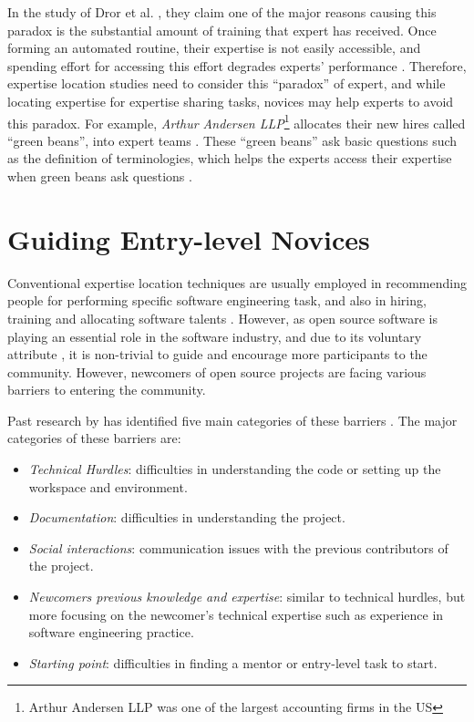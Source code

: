 In the study of Dror et al. \cite{dror2011paradox}, they claim one of the major reasons causing this paradox is the substantial amount of training that expert has received. Once forming an automated routine, their expertise is not easily accessible, and spending effort for accessing this effort degrades experts' performance \cite{flegal2008overthinking}. Therefore, expertise location studies need to consider this ``paradox'' of expert, and while locating expertise for expertise sharing tasks, novices may help experts to avoid this paradox. For example, \textit{Arthur Andersen LLP}\footnote{Arthur Andersen LLP was one of the largest accounting firms in the US} allocates their new hires called ``green beans'', into expert teams \cite{greenbeans}. These ``green beans'' ask basic questions such as the definition of terminologies, which helps the experts access their expertise when green beans ask questions \cite{kelly2009leadership}.

\section{Guiding Entry-level Novices}

Conventional expertise location techniques are usually employed in recommending people for performing specific software engineering task, and also in hiring, training and allocating software talents \cite{bergersen2014construction}. However, as open source software is playing an essential role in the software industry,  and due to its voluntary attribute \cite{shah2006motivation}, it is non-trivial to guide and encourage more participants to the community. However, newcomers of open source projects are facing various barriers to entering the community.

Past research by \citeauthor{STEINMACHER201567} has identified five main categories of these barriers \cite{STEINMACHER201567}. The major categories of these barriers are:

\begin{itemize}
    \item \textit{Technical Hurdles}: difficulties in understanding the code or setting up the workspace and environment.
    \item \textit{Documentation}: difficulties in understanding the project.
    \item \textit{Social interactions}: communication issues with the previous contributors of the project.
    \item \textit{Newcomers previous knowledge and expertise}: similar to technical hurdles, but more focusing on the newcomer's technical expertise such as experience in software engineering practice.
    \item \textit{Starting point}: difficulties in finding a mentor or entry-level task to start.
\end{itemize}

